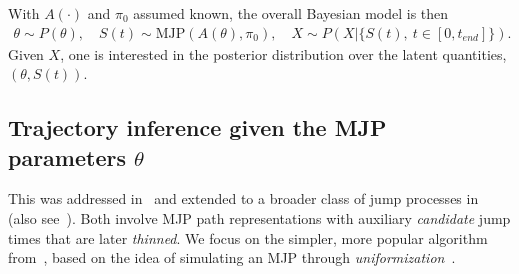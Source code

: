 With $A(\cdot)$ and $\pi_0$ assumed known, the overall Bayesian model is then 
\begin{align}
  \label{eq:bayes_model}
  \theta \sim P(\theta), \quad S(t) \sim \text{MJP}(A(\theta), \pi_0), \quad X \sim P(X|\{S(t),\ t \in [0,t_{end}]\}).
\end{align}
Given $X$, one is interested in the posterior distribution over the latent quantities, $(\theta,S(t))$. 

\subsection{Trajectory inference given the MJP parameters $\theta$}
This was addressed in~\cite{RaoTeh13}  and extended to a broader class of jump processes in~\cite{RaoTeh12} (also see~\cite{FearnSher2006, Hobolth09, Elhaygibbssampling}). 
Both involve MJP path representations with auxiliary {\em candidate} jump times that are later {\em thinned}.  
We focus on the simpler, more popular algorithm from~\cite{RaoTeh13}, based on the idea of simulating an MJP through {\em uniformization}~\citep{Jen1953}. 

